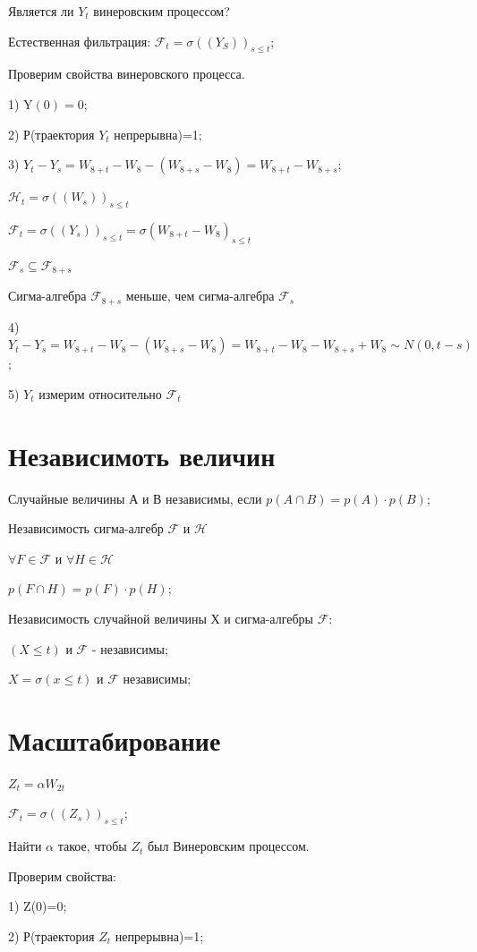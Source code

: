 \documentclass[a4paper]{article}
\begin{document}
Является ли $Y_t$ винеровским процессом?

Естественная фильтрация: $\mathcal{F}_t=\sigma((Y_S))_{s\le t}$;

Проверим свойства винеровского процесса.

1) Y$(0)=0$;

2) Р(траектория $Y_t$ непрерывна)=1;

3) $Y_t-Y_s=W_{8+t} - W_8-(W_{8+s} - W_8)=W_{8+t}-W_{8+s}$;

$\mathcal{H}_t=\sigma((W_s))_{s\le t}$

$\mathcal{F}_t=\sigma((Y_s))_{s\le t}=\sigma(W_{8+t}-W_8)_{s\le t}$

$\mathcal{F}_s\subseteq \mathcal{F}_{8+s}$

Сигма-алгебра $\mathcal{F}_{8+s}$ меньше, чем сигма-алгебра $\mathcal{F}_s$

4) $Y_t-Y_s=W_{8+t} - W_8-(W_{8+s} - W_8)=W_{8+t}-W_8-W_{8+s}+W_8 \sim N(0,t-s)$;

5) $Y_t$ измерим относительно $\mathcal{F}_t$


\section*{Независимоть величин}

Случайные величины А и В независимы, если $p(A\cap B)=p(A)\cdot p(B)$;

Независимость сигма-алгебр $\mathcal{F}$ и $\mathcal{H}$

$\forall F \in \mathcal{F}$ и $\forall H\in \mathcal{H}$

$p(F\cap H)=p(F)\cdot p(H)$;

Независимость случайной величины Х и сигма-алгебры $\mathcal{F}$:

${(X\le t)}$ и $\mathcal{F}$ - независимы;

$X=\sigma({x\le t}) $ и $\mathcal{F}$ независимы;

\section*{Масштабирование}

$Z_t=\alpha W_{2t}$

$\mathcal{F}_t=\sigma((Z_s))_{s\le t}$;

Найти $\alpha$ такое, чтобы $Z_t$ был Винеровским процессом.

Проверим свойства:

1) Z(0)=0;

2) Р(траектория $Z_t$ непрерывна)=1;
\end{document}

